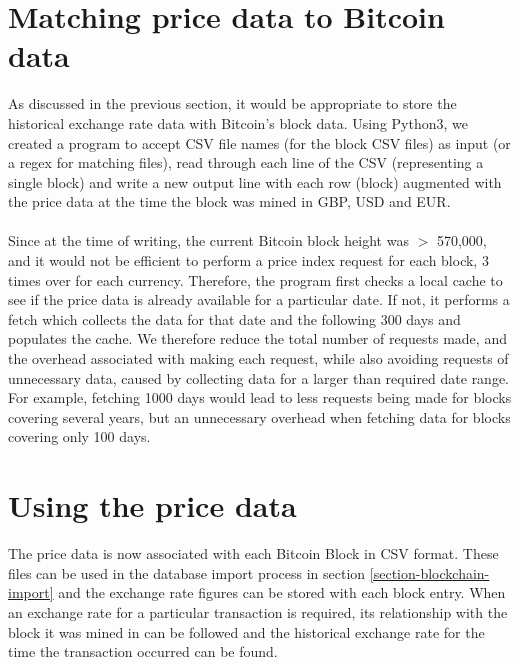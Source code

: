 \section{Matching price data to Bitcoin data}
As discussed in the previous section, it would be appropriate to store the historical exchange rate data with Bitcoin's block data. Using Python3, we created a program to accept CSV file names (for the block CSV files) as input (or a regex for matching files), read through each line of the CSV (representing a single block) and write a new output line with each row (block) augmented with the price data at the time the block was mined in GBP, USD and EUR. 
\\\\
Since at the time of writing, the current Bitcoin block height was $>$ 570,000, and it would not be efficient to perform a price index request for each block, 3 times over for each currency. Therefore, the program first checks a local cache to see if the price data is already available for a particular date. If not, it performs a fetch which collects the data for that date and the following 300 days and populates the cache. We therefore reduce the total number of requests made, and the overhead associated with making each request, while also avoiding requests of unnecessary data, caused by collecting data for a larger than required date range. For example, fetching 1000 days would lead to less requests being made for blocks covering several years, but an unnecessary overhead when fetching data for blocks covering only 100 days.

\section{Using the price data}
The price data is now associated with each Bitcoin Block in CSV format. These files can be used in the database import process in section \ref{section-blockchain-import} and the exchange rate figures can be stored with each block entry. When an exchange rate for a particular transaction is required, its relationship with the block it was mined in can be followed and the historical exchange rate for the time the transaction occurred can be found. 